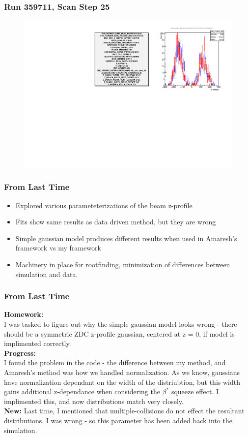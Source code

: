 \begin{frame}
\frametitle{Run 359711, Scan Step 25}
\begin{figure}
\begin{center}
\includegraphics[width=\linewidth]{"figs/359711_step_25_zdc_zvertex"}
\caption{ }
\label{fig:359711_step_25_zdc_zvertex}
\end{center}\end{figure}
\end{frame}

\begin{frame}
\frametitle{From Last Time}
\begin{itemize}
	\item Explored various parameteterizations of the beam z-profile
	\item Fits show same results as data driven method, but they are wrong
	\item Simple gaussian model produces different results when used in Amaresh's
		framework vs my framework
	\item Machinery in place for rootfinding, minimization of differences between
		simulation and data.
\end{itemize}
\end{frame}
\begin{frame}
\frametitle{From Last Time}

\textbf{Homework:} \\
I was tasked to figure out why the simple gaussian model looks wrong - there
should be a symmetric ZDC z-profile gaussian, centered at z = 0, if model is
implimented correctly.\\
\textbf{Progress:} \\
I found the problem in the code - the difference between my method, and
Amaresh's method was how we handled normalization. As we know, gaussians have
normalization dependant on the width of the distriubtion, but this width gains
additional z-dependance when considering the $\beta^*$ squeeze effect. I
implimented this, and now distributions match very closely.\\
\textbf{New:}
Last time, I mentioned that multiple-collisions do not effect the resultant
distributions. I was wrong - so this parameter has been added back into the
simulation.
\end{frame}

